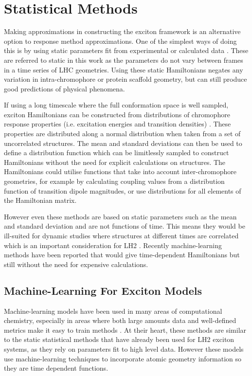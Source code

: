 \section{Statistical Methods}
\label{sec:stats_methods}

Making approximations in constructing the exciton framework is an alternative option
to response method approximations. One of the simplest ways of doing this is by 
using static parameters fit from experimental or calculated data \cite{Cory1998, Hu1997, Tretiak2000}. 
These are referred to static in this work as the parameters do not vary between 
frames in a time series of LHC geometries. Using these static Hamiltonians negates
any variation in intra-chromophore or protein scaffold geometry, but can still produce
good predictions of physical phenomena.

If using a long timescale where the full conformation space is well sampled, exciton
Hamiltonians can be constructed from distributions of chromophore response properties
(i.e. excitation energies and transition densities) \cite{Stross2016}. These properties
are distributed along a normal distribution when taken from a set of uncorrelated 
structures. The mean and standard deviations can then be used to define a distribution
function which can be limitlessly sampled to construct Hamiltonians without the 
need for explicit calculations on structures. The Hamiltonians could utilise functions
that take into account inter-chromophore geometries, for example by calculating 
coupling values from a distribution function of transition dipole magnitudes, or
use distributions for all elements of the Hamiltonian matrix.

However even these methods are based on static parameters such as the mean and standard
deviation and are not functions of time. This means they would be ill-suited for
dynamic studies where structures at different times are correlated which is an important
consideration for LH2 \cite{Papiz2003}. Recently machine-learning methods have been
reported that would give time-dependent Hamiltonians but still without the need 
for expensive calculations.

\subsection{Machine-Learning For Exciton Models}
\label{subsec:machine_learning} 

Machine-learning models have been used in many areas of computational chemistry,
especially in areas where both large amounts data and well-defined metrics make 
it easy to train  methods \cite{Dral2020, Behler2011, Westermayr2020, Schutt2019, Sajjan2022}.
At their heart, these methods are similar to the static statistical methods that
have already been used for LH2 exciton systems, as they rely on parameters fit to
high level data. However these models use machine-learning techniques to incorporate 
atomic geometry information so they are time dependent functions.


